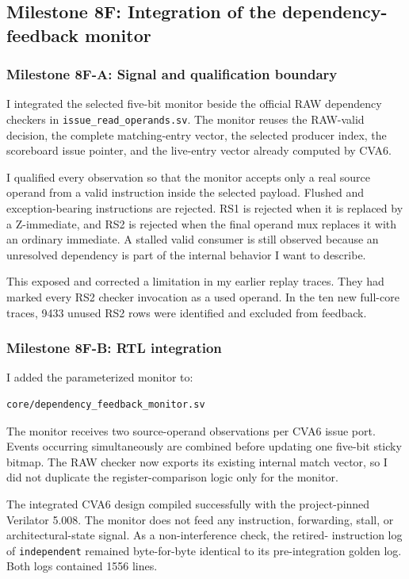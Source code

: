 \subsection{Milestone 8F: Integration of the dependency-feedback monitor}

\subsubsection*{Milestone 8F-A: Signal and qualification boundary}

I integrated the selected five-bit monitor beside the official RAW dependency
checkers in \texttt{issue\_read\_operands.sv}. The monitor reuses the RAW-valid
decision, the complete matching-entry vector, the selected producer index, the
scoreboard issue pointer, and the live-entry vector already computed by CVA6.

I qualified every observation so that the monitor accepts only a real source
operand from a valid instruction inside the selected payload. Flushed and
exception-bearing instructions are rejected. RS1 is rejected when it is
replaced by a Z-immediate, and RS2 is rejected when the final operand mux
replaces it with an ordinary immediate. A stalled valid consumer is still
observed because an unresolved dependency is part of the internal behavior I
want to describe.

This exposed and corrected a limitation in my earlier replay traces. They had
marked every RS2 checker invocation as a used operand. In the ten new full-core
traces, 9433 unused RS2 rows were identified and excluded from feedback.

\subsubsection*{Milestone 8F-B: RTL integration}

I added the parameterized monitor to:

\begin{verbatim}
core/dependency_feedback_monitor.sv
\end{verbatim}

The monitor receives two source-operand observations per CVA6 issue port.
Events occurring simultaneously are combined before updating one five-bit
sticky bitmap. The RAW checker now exports its existing internal match vector,
so I did not duplicate the register-comparison logic only for the monitor.

The integrated CVA6 design compiled successfully with the project-pinned
Verilator 5.008. The monitor does not feed any instruction, forwarding, stall,
or architectural-state signal. As a non-interference check, the retired-
instruction log of \texttt{independent} remained byte-for-byte identical to its
pre-integration golden log. Both logs contained 1556 lines.

